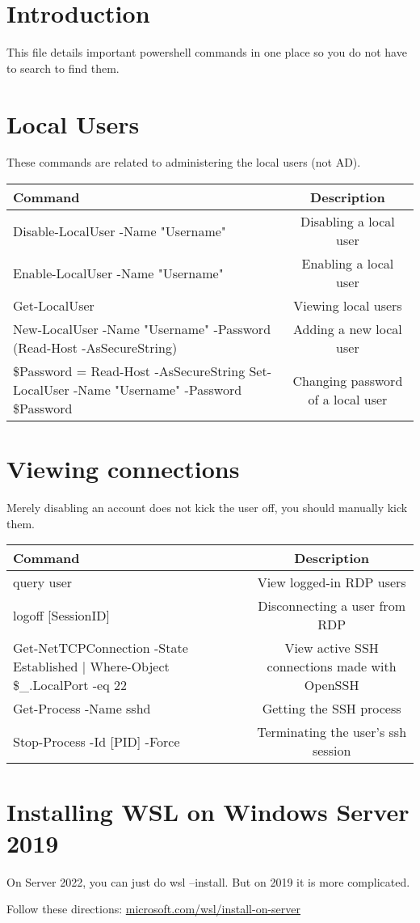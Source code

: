 \documentclass{article}
\begin{document}
\graphicspath{ {./Images/} }
\tableofcontents

\section{Introduction}
This file details important powershell commands in one place so you do not have to search to find them.

\section{Local Users}
These commands are related to administering the local users (not AD).

\begin{table}[h]
\centering
\begin{tabular}{| m{20em} |c|} %
Command & Description \\
\hline
Disable-LocalUser -Name "Username" & Disabling a local user \\
Enable-LocalUser -Name "Username" & Enabling a local user \\
Get-LocalUser & Viewing local users \\
New-LocalUser -Name "Username" 
-Password (Read-Host -AsSecureString) & Adding a new local user \\
\$Password = Read-Host -AsSecureString
Set-LocalUser -Name "Username" -Password \$Password & Changing password of a local user \\
\hline
\end{tabular}
\end{table}

\section{Viewing connections}
Merely disabling an account does not kick the user off, you should manually kick them.

\begin{table}[h]
\centering
\begin{tabular}{| m{20em} |c|} %
Command & Description \\
\hline
query user & View logged-in RDP users \\
logoff [SessionID] & Disconnecting a user from RDP \\
Get-NetTCPConnection -State Established | 
Where-Object { \$\_.LocalPort -eq 22 } & View active SSH connections made with OpenSSH \\
Get-Process -Name sshd & Getting the SSH process \\
Stop-Process -Id [PID] -Force & Terminating the user's ssh session \\
\hline
\end{tabular}
\end{table}

\section{Installing WSL on Windows Server 2019}
On Server 2022, you can just do wsl --install. But on 2019 it is more complicated. 

Follow these directions: \href{https://learn.microsoft.com/en-us/windows/wsl/install-on-server}{microsoft.com/wsl/install-on-server}
\end{document}
